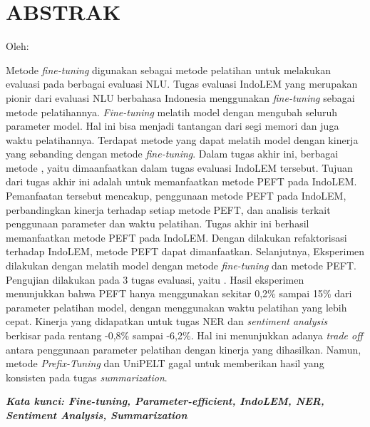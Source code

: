 \clearpage
\chapter*{ABSTRAK}

\begin{center}
    \center
    \begin{singlespace}
        \large\bfseries\MakeUppercase{\thetitle}
    
        \normalfont\normalsize
        Oleh:
    
        \bfseries \theauthor
    \end{singlespace}
\end{center} 

\begin{singlespace}
    Metode \textit{fine-tuning} digunakan sebagai metode pelatihan untuk melakukan evaluasi pada berbagai evaluasi NLU. Tugas evaluasi IndoLEM yang merupakan pionir dari evaluasi NLU berbahasa Indonesia menggunakan \textit{fine-tuning} sebagai metode pelatihannya. \textit{Fine-tuning} melatih model dengan mengubah seluruh parameter model. Hal ini bisa menjadi tantangan dari segi memori dan juga waktu pelatihannya. Terdapat metode \PEFT yang dapat melatih model dengan kinerja yang sebanding dengan metode \textit{fine-tuning}. Dalam tugas akhir ini, berbagai metode \PEFT, yaitu \methodPEFT dimaanfaatkan dalam tugas evaluasi IndoLEM tersebut. Tujuan dari tugas akhir ini adalah untuk memanfaatkan metode PEFT pada IndoLEM. Pemanfaatan tersebut mencakup, penggunaan metode PEFT pada IndoLEM, perbandingkan kinerja terhadap setiap metode PEFT, dan analisis terkait penggunaan parameter dan waktu pelatihan.
    Tugas akhir ini berhasil memanfaatkan metode PEFT pada IndoLEM. Dengan dilakukan refaktorisasi terhadap IndoLEM, metode PEFT dapat dimanfaatkan. Selanjutnya, Eksperimen dilakukan dengan melatih model dengan metode \textit{fine-tuning} dan metode PEFT. Pengujian dilakukan pada 3 tugas evaluasi, yaitu \nlptask. Hasil eksperimen menunjukkan bahwa PEFT hanya menggunakan sekitar 0,2\% sampai 15\% dari parameter pelatihan model, dengan menggunakan waktu pelatihan yang lebih cepat. Kinerja yang didapatkan untuk tugas NER dan \textit{sentiment analysis} berkisar pada rentang -0,8\% sampai -6,2\%. Hal ini menunjukkan adanya \textit{trade off} antara penggunaan parameter pelatihan dengan kinerja yang dihasilkan. Namun, metode \textit{Prefix-Tuning} dan UniPELT gagal untuk memberikan hasil yang konsisten pada tugas \textit{summarization}.

    \textit{\textbf{Kata kunci: Fine-tuning, Parameter-efficient, IndoLEM, NER, Sentiment Analysis, Summarization}}
\end{singlespace}

\clearpage

